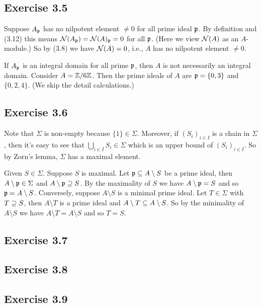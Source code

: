 \documentclass[../A&M.tex]{subfiles}
\begin{document}
\subsection*{Exercise 3.5}

Suppose $A_{\mathfrak{p}}$ has no nilpotent element $\neq0$ for all prime ideal $\mathfrak{p}$. By definition and (3.12) this means $\mathcal{N}(A_{\mathfrak{p}}) = \mathcal{N}(A)_{\mathfrak{p}} = 0$ for all $\mathfrak{p}$. (Here we view $\mathcal{N}(A)$ as an $A$-module.) So by (3.8) we have $\mathcal{N}(A)=0$, i.e., $A$ has no nilpotent element $\neq0$.

If $A_{\mathfrak{p}}$ is an integral domain for all prime $\mathfrak{p}$, then $A$ is not necessarily an integral domain. Consider $A=\mathbb{Z}/6\mathbb{Z}$. Then the prime ideals of $A$ are $\mathfrak{p} = \{0,3\}$ and $\{0,2,4\}$. (We skip the detail calculations.)

\subsection*{Exercise 3.6}

Note that $\Sigma$ is non-empty because $\{1\} \in \Sigma$. Moreover, if $(S_i)_{i\in I}$ is a chain in $\Sigma$, then it's easy to see that $\bigcup_{i\in I} S_i \in \Sigma$ which is an upper bound of $(S_i)_{i\in I}$. So by Zorn's lemma, $\Sigma$ has a maximal element.

Given $S\in \Sigma$. Suppose $S$ is maximal. Let $\mathfrak{p} \subseteq A \setminus S$ be a prime ideal, then $A \setminus \mathfrak{p} \in \Sigma$ and $A \setminus \mathfrak{p} \supseteq S$. By the maximality of $S$ we have $A \setminus \mathfrak{p} = S$ and so $\mathfrak{p} = A \setminus S$. Conversely, suppose $A\setminus S$ is a minimal prime ideal. Let $T \in \Sigma$ with $T\supseteq S$, then $A \setminus T$ is a prime ideal and $A \setminus T \subseteq A \setminus S$. So by the minimality of $A \setminus S$ we have $A \setminus T = A \setminus S$ and so $T=S$.

\subsection*{Exercise 3.7}

\subsection*{Exercise 3.8}

\subsection*{Exercise 3.9}
\end{document}
